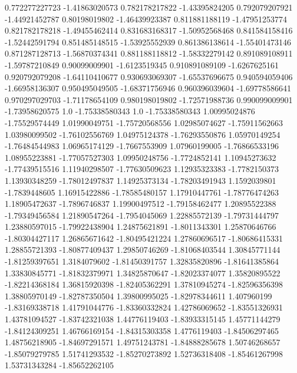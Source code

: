  0.772277227723   -1.41863020573
 0.782178217822   -1.43395824205
 0.792079207921   -1.44921452787
  0.80198019802   -1.46439923387
 0.811881188119   -1.47951253774
 0.821782178218   -1.49455462414
 0.831683168317   -1.50952568468
 0.841584158416   -1.52442591794
 0.851485148515   -1.53925552939
 0.861386138614   -1.55401473146
 0.871287128713   -1.56870374341
 0.881188118812   -1.58332279142
 0.891089108911   -1.59787210849
  0.90099009901    -1.6123519345
 0.910891089109    -1.6267625161
 0.920792079208   -1.64110410677
 0.930693069307   -1.65537696675
 0.940594059406   -1.66958136307
 0.950495049505   -1.68371756946
 0.960396039604   -1.69778586641
 0.970297029703   -1.71178654109
 0.980198019802   -1.72571988736
 0.990099009901   -1.73958620575
            1.0   -1.75338580343
            1.0   -1.75338580343
  1.00995024876   -1.75529574449
  1.01990049751   -1.75720568556
  1.02985074627   -1.75911562663
  1.03980099502   -1.76102556769
  1.04975124378   -1.76293550876
  1.05970149254   -1.76484544983
  1.06965174129    -1.7667553909
  1.07960199005   -1.76866533196
  1.08955223881   -1.77057527303
  1.09950248756    -1.7724852141
  1.10945273632   -1.77439515516
  1.11940298507   -1.77630509623
  1.12935323383    -1.7782150373
  1.13930348259   -1.78012497837
  1.14925373134   -1.78203491943
   1.1592039801    -1.7839448605
  1.16915422886   -1.78585480157
  1.17910447761   -1.78776474263
  1.18905472637    -1.7896746837
  1.19900497512   -1.79158462477
  1.20895522388   -1.79349456584
  1.21890547264    -1.7954045069
  1.22885572139   -1.79731444797
  1.23880597015   -1.79922438904
  1.24875621891    -1.8011343301
  1.25870646766   -1.80304427117
  1.26865671642   -1.80495421224
  1.27860696517   -1.80686415331
  1.28855721393   -1.80877409437
  1.29850746269   -1.81068403544
  1.30845771144   -1.81259397651
   1.3184079602   -1.81450391757
  1.32835820896   -1.81641385864
  1.33830845771   -1.81832379971
  1.34825870647   -1.82023374077
  1.35820895522   -1.82214368184
  1.36815920398   -1.82405362291
  1.37810945274   -1.82596356398
  1.38805970149   -1.82787350504
  1.39800995025   -1.82978344611
    1.407960199   -1.83169338718
  1.41791044776   -1.83360332824
  1.42786069652   -1.83551326931
  1.43781094527   -1.83742321038
  1.44776119403   -1.83933315145
  1.45771144279   -1.84124309251
  1.46766169154   -1.84315303358
   1.4776119403   -1.84506297465
  1.48756218905   -1.84697291571
  1.49751243781   -1.84888285678
  1.50746268657   -1.85079279785
  1.51741293532   -1.85270273892
  1.52736318408   -1.85461267998
  1.53731343284   -1.85652262105
